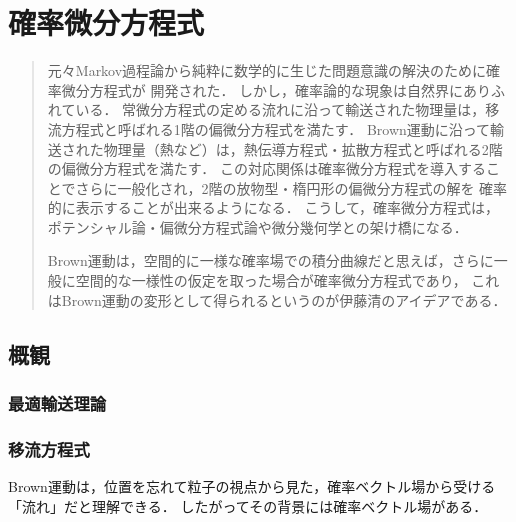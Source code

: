 \documentclass[uplatex,dvipdfmx]{jsreport}
\begin{document}
\chapter{確率微分方程式}

\begin{quotation}
    元々Markov過程論から純粋に数学的に生じた問題意識の解決のために確率微分方程式が
    開発された．
    しかし，確率論的な現象は自然界にありふれている．
    常微分方程式の定める流れに沿って輸送された物理量は，移流方程式と呼ばれる1階の偏微分方程式を満たす．
    Brown運動に沿って輸送された物理量（熱など）は，熱伝導方程式・拡散方程式と呼ばれる2階の偏微分方程式を満たす．
    この対応関係は確率微分方程式を導入することでさらに一般化され，2階の放物型・楕円形の偏微分方程式の解を
    確率的に表示することが出来るようになる．
    こうして，確率微分方程式は，ポテンシャル論・偏微分方程式論や微分幾何学との架け橋になる．

    Brown運動は，空間的に一様な確率場での積分曲線だと思えば，さらに一般に空間的な一様性の仮定を取った場合が確率微分方程式であり，
    これはBrown運動の変形として得られるというのが伊藤清のアイデアである．
\end{quotation}

\section{概観}

\subsection{最適輸送理論}

\begin{definition}
    
\end{definition}

\subsection{移流方程式}

\begin{tcolorbox}[colframe=ForestGreen, colback=ForestGreen!10!white,breakable,colbacktitle=ForestGreen!40!white,coltitle=black,fonttitle=\bfseries\sffamily,
title=]
    Brown運動は，位置を忘れて粒子の視点から見た，確率ベクトル場から受ける「流れ」だと理解できる．
    したがってその背景には確率ベクトル場がある．
\end{tcolorbox}
\end{document}
